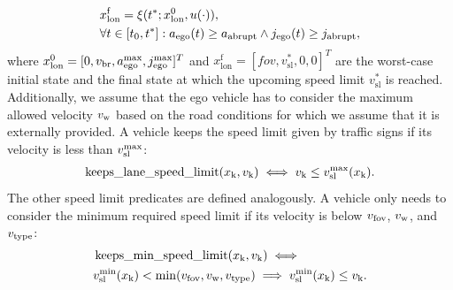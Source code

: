 \begin{align*}
\begin{split}
& x^\mathrm{f}_\mathrm{lon} =  \xi(t^*;x^\mathrm{0}_\mathrm{lon}, u(\cdot)), \\
& \forall t \in [t_0, t^*]: a_\text{ego}(t) \geq a_\text{abrupt} \land j_\text{ego}(t) \geq j_\text{abrupt}, \\
\end{split}
\end{align*}
where $x^\mathrm{0}_\mathrm{lon} = [0, v_\text{br}, a_\text{ego}^\text{max} ,j_\text{ego}^\text{max}]^T$ and $x^\mathrm{f}_\mathrm{lon} = [fov, v_\mathrm{sl}^*, 0, 0]^T$ are the worst-case initial state and the final state at which the upcoming speed limit $v_\mathrm{sl}^*$ is reached. 
Additionally, we assume that the ego vehicle has to consider the maximum allowed velocity $v_\text{w}$ based on the road conditions for which we assume that it is externally provided.
A vehicle keeps the speed limit given by traffic signs if its velocity is less than $v_\text{sl}^\text{max}$:
\begin{align*}
\operatorname*{keeps\_lane\_speed\_limit}(x_\text{k}, v_\mathrm{k}) \iff v_\mathrm{k} \leq v_\text{sl}^\text{max}(x_\text{k}).
\end{align*}
The other speed limit predicates are defined analogously.
A vehicle only needs to consider the minimum required speed limit if its velocity is below $v_\text{fov}$, $v_\text{w}$, and $v_\text{type}$:
\begin{align*}
\begin{split}
&\operatorname*{keeps\_min\_speed\_limit}(x_\text{k}, v_\mathrm{k}) \iff \\
&v_\text{sl}^\text{min}(x_\text{k}) < \min(v_\text{fov}, v_\text{w}, v_\text{type}) \implies v_\text{sl}^\text{min}(x_\text{k}) \leq v_\mathrm{k}.
\end{split}
\end{align*}
